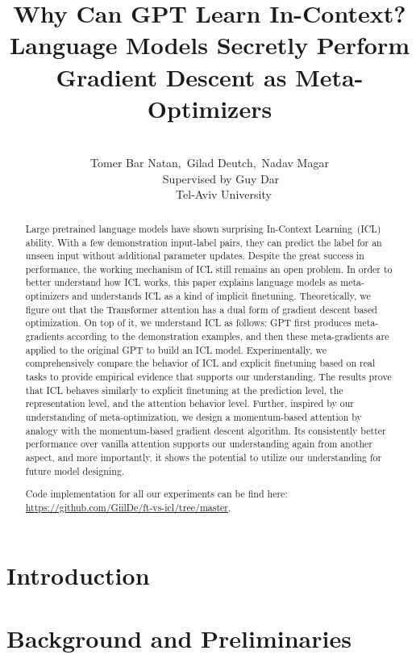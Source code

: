 \documentclass[11pt]{article}
\title{Why Can GPT Learn In-Context? \\ Language Models Secretly Perform Gradient Descent as Meta-Optimizers}
\author{\\
Tomer Bar Natan,~Gilad Deutch,~Nadav Magar\\
~~~~Supervised by Guy Dar\\
~~~~~Tel-Aviv University}
\date{}
\begin{document}
\maketitle

\begin{abstract}

	Large pretrained language models have shown surprising In-Context Learning~(ICL) ability.
	With a few demonstration input-label pairs, they can predict the label for an unseen input without additional parameter updates.
	Despite the great success in performance, the working mechanism of ICL still remains an open problem.
	In order to better understand how ICL works, this paper explains language models as meta-optimizers and understands ICL as a kind of implicit finetuning.
	Theoretically, we figure out that the Transformer attention has a dual form of gradient descent based optimization.
	On top of it, we understand ICL as follows: GPT first produces meta-gradients according to the demonstration examples, and then these meta-gradients are applied to the original GPT to build an ICL model.
	Experimentally, we comprehensively compare the behavior of ICL and explicit finetuning based on real tasks to provide empirical evidence that supports our understanding.
	The results prove that ICL behaves similarly to explicit finetuning at the prediction level, the representation level, and the attention behavior level.
	Further, inspired by our understanding of meta-optimization, we design a momentum-based attention by analogy with the momentum-based gradient descent algorithm.
	Its consistently better performance over vanilla attention supports our understanding again from another aspect, and more importantly, it shows the potential to utilize our understanding for future model designing.

	Code implementation for all our experiments can be find here:
	\href{https://github.com/GiilDe/ft-vs-icl/tree/master}{https://github.com/GiilDe/ft-vs-icl/tree/master}.
\end{abstract}

\section{Introduction}


\section{Background and Preliminaries}

\end{document}
